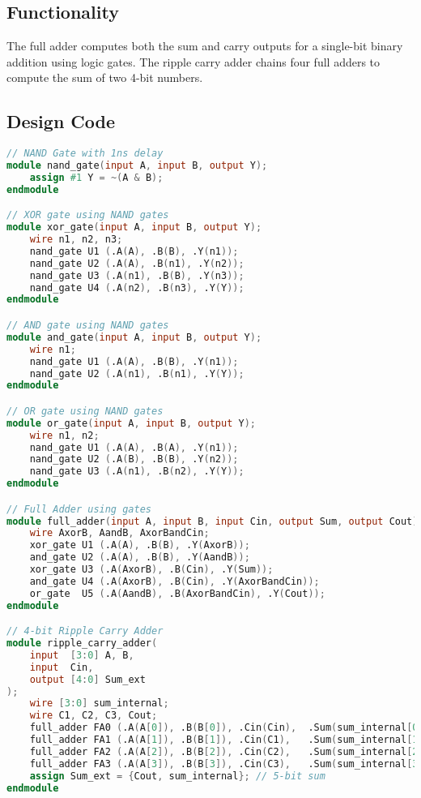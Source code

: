 \documentclass{article}
\begin{document}
\subsection*{Functionality}
The full adder computes both the sum and carry outputs for a single-bit binary addition using logic gates. The ripple carry adder chains four full adders to compute the sum of two 4-bit numbers.

\subsection*{Design Code}
\begin{lstlisting}[language=Verilog]
// NAND Gate with 1ns delay
module nand_gate(input A, input B, output Y);
    assign #1 Y = ~(A & B);
endmodule

// XOR gate using NAND gates
module xor_gate(input A, input B, output Y);
    wire n1, n2, n3;
    nand_gate U1 (.A(A), .B(B), .Y(n1));
    nand_gate U2 (.A(A), .B(n1), .Y(n2));
    nand_gate U3 (.A(n1), .B(B), .Y(n3));
    nand_gate U4 (.A(n2), .B(n3), .Y(Y));
endmodule

// AND gate using NAND gates
module and_gate(input A, input B, output Y);
    wire n1;
    nand_gate U1 (.A(A), .B(B), .Y(n1));
    nand_gate U2 (.A(n1), .B(n1), .Y(Y));
endmodule

// OR gate using NAND gates
module or_gate(input A, input B, output Y);
    wire n1, n2;
    nand_gate U1 (.A(A), .B(A), .Y(n1));
    nand_gate U2 (.A(B), .B(B), .Y(n2));
    nand_gate U3 (.A(n1), .B(n2), .Y(Y));
endmodule

// Full Adder using gates
module full_adder(input A, input B, input Cin, output Sum, output Cout);
    wire AxorB, AandB, AxorBandCin;
    xor_gate U1 (.A(A), .B(B), .Y(AxorB));
    and_gate U2 (.A(A), .B(B), .Y(AandB));
    xor_gate U3 (.A(AxorB), .B(Cin), .Y(Sum));
    and_gate U4 (.A(AxorB), .B(Cin), .Y(AxorBandCin));
    or_gate  U5 (.A(AandB), .B(AxorBandCin), .Y(Cout));
endmodule

// 4-bit Ripple Carry Adder
module ripple_carry_adder(
    input  [3:0] A, B,
    input  Cin,
    output [4:0] Sum_ext
);
    wire [3:0] sum_internal;
    wire C1, C2, C3, Cout;
    full_adder FA0 (.A(A[0]), .B(B[0]), .Cin(Cin),  .Sum(sum_internal[0]), .Cout(C1));
    full_adder FA1 (.A(A[1]), .B(B[1]), .Cin(C1),   .Sum(sum_internal[1]), .Cout(C2));
    full_adder FA2 (.A(A[2]), .B(B[2]), .Cin(C2),   .Sum(sum_internal[2]), .Cout(C3));
    full_adder FA3 (.A(A[3]), .B(B[3]), .Cin(C3),   .Sum(sum_internal[3]), .Cout(Cout));
    assign Sum_ext = {Cout, sum_internal}; // 5-bit sum
endmodule
\end{lstlisting}
\end{document}
